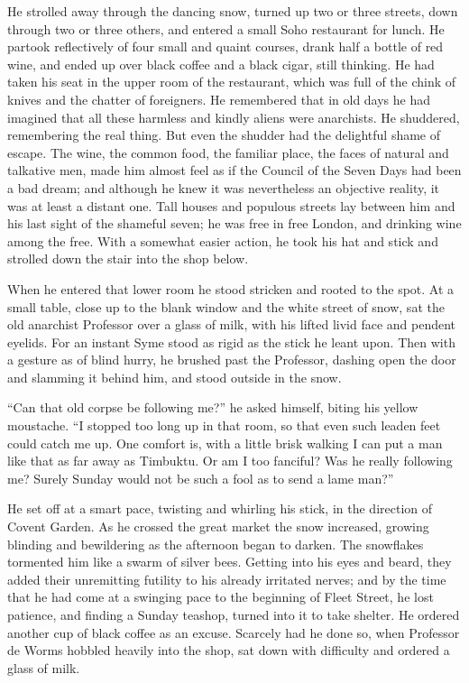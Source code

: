 He strolled away through the dancing snow, turned up two or three streets, down through two or three others, and entered a small Soho restaurant for lunch. He partook reflectively of four small and quaint courses, drank half a bottle of red wine, and ended up over black coffee and a black cigar, still thinking. He had taken his seat in the upper room of the restaurant, which was full of the chink of knives and the chatter of foreigners. He remembered that in old days he had imagined that all these harmless and kindly aliens were anarchists. He shuddered, remembering the real thing. But even the shudder had the delightful shame of escape. The wine, the common food, the familiar place, the faces of natural and talkative men, made him almost feel as if the Council of the Seven Days had been a bad dream; and although he knew it was nevertheless an objective reality, it was at least a distant one. Tall houses and populous streets lay between him and his last sight of the shameful seven; he was free in free London, and drinking wine among the free. With a somewhat easier action, he took his hat and stick and strolled down the stair into the shop below.

When he entered that lower room he stood stricken and rooted to the spot. At a small table, close up to the blank window and the white street of snow, sat the old anarchist Professor over a glass of milk, with his lifted livid face and pendent eyelids. For an instant Syme stood as rigid as the stick he leant upon. Then with a gesture as of blind hurry, he brushed past the Professor, dashing open the door and slamming it behind him, and stood outside in the snow.

“Can that old corpse be following me?” he asked himself, biting his yellow moustache. “I stopped too long up in that room, so that even such leaden feet could catch me up. One comfort is, with a little brisk walking I can put a man like that as far away as Timbuktu. Or am I too fanciful? Was he really following me? Surely Sunday would not be such a fool as to send a lame man?”

He set off at a smart pace, twisting and whirling his stick, in the direction of Covent Garden. As he crossed the great market the snow increased, growing blinding and bewildering as the afternoon began to darken. The snowflakes tormented him like a swarm of silver bees. Getting into his eyes and beard, they added their unremitting futility to his already irritated nerves; and by the time that he had come at a swinging pace to the beginning of Fleet Street, he lost patience, and finding a Sunday teashop, turned into it to take shelter. He ordered another cup of black coffee as an excuse. Scarcely had he done so, when Professor de Worms hobbled heavily into the shop, sat down with difficulty and ordered a glass of milk.

